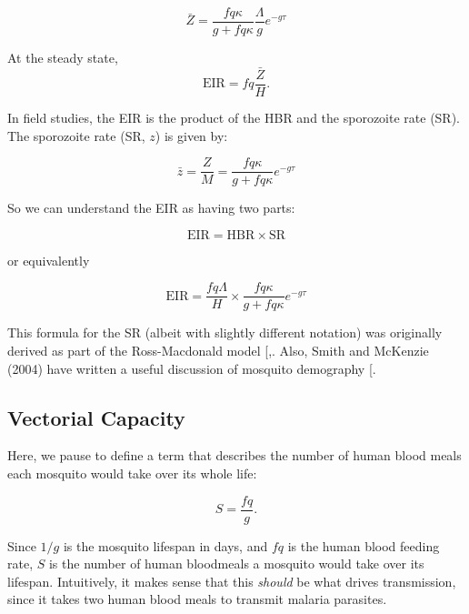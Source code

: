 \documentclass[
]{book}
\begin{document}
\begin{equation}
\bar Z =  \frac{f q \kappa}{g + fq \kappa} \frac{\Lambda}{g} e^{-g\tau} 
\end{equation}

At the steady state, \[\mbox{EIR} = fq \frac{\bar Z}{H}.\]

In field studies, the EIR is the product of the HBR and the sporozoite rate (SR). The sporozoite rate (SR, \(z\)) is given by:

\begin{equation}
\bar z =  \frac{Z}{M} = \frac{f q \kappa}{g + fq \kappa} e^{-g\tau} 
\end{equation}

So we can understand the EIR as having two parts:

\begin{equation}
\mbox{EIR} = \mbox{HBR} \times  \mbox{SR} 
\end{equation}

or equivalently

\begin{equation}
\mbox{EIR} = \frac{\textstyle{fq\Lambda}}{\textstyle{H}} \times \frac{\textstyle{f q \kappa}}{\textstyle{g + fq \kappa}} e^{-g\tau} 
\end{equation}

This formula for the SR (albeit with slightly different notation) was originally derived as part of the Ross-Macdonald model {[},\citeproc{ref-ArmitageP1953}{61}{]}. Also, Smith and McKenzie (2004) have written a useful discussion of mosquito demography {[}\citeproc{ref-SmithDL2004_Statics}{\textbf{SmithDL2004\_Statics?}}{]}.

\subsection{Vectorial Capacity}\label{vectorial-capacity}

Here, we pause to define a term that describes the number of human blood meals each mosquito would take over its whole life:

\[S = \frac{fq}{g}.\]

Since \(1/g\) is the mosquito lifespan in days, and \(fq\) is the human blood feeding rate, \(S\) is the number of human bloodmeals a mosquito would take over its lifespan. Intuitively, it makes sense that this \emph{should} be what drives transmission, since it takes two human blood meals to transmit malaria parasites.
\end{document}

